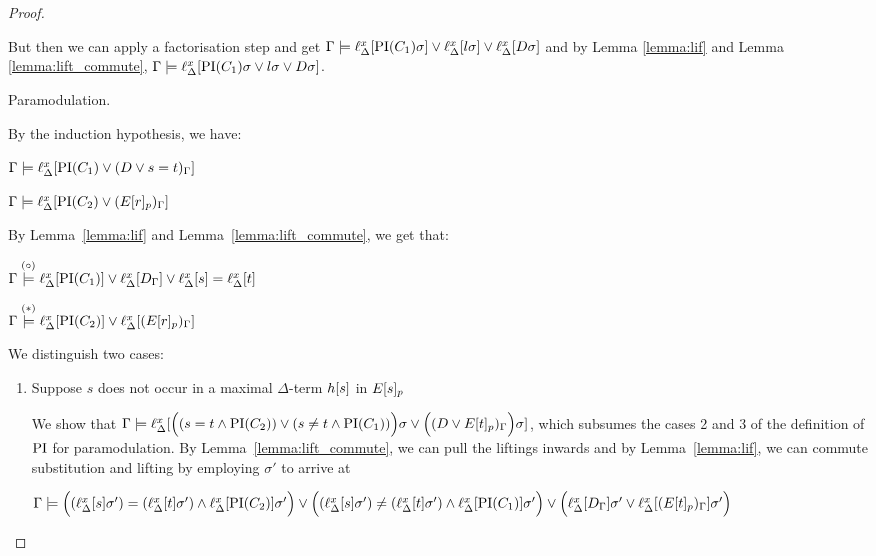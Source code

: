 \begin{proof}
\begin{description}
			But then we can apply a factorisation step and get
			$\Gamma \models \ell_{\Delta}^{x}[\operatorname{PI}(C_1)\sigma] \lor \ell_{\Delta}^{x}[l\sigma] \lor \ell_{\Delta}^{x}[D\sigma]$ and by Lemma \ref{lemma:lif} and Lemma \ref{lemma:lift_commute}, 
			$\Gamma \entails\nolinebreak \lifdelta{\PI(C_1)\sigma \lor l\sigma \lor D\sigma}$.



		\item{Paramodulation.}
			\begin{prooftree}
			\end{prooftree}
			By the induction hypothesis, we have:

			$\Gamma \models \ell_{\Delta}^{x}[\operatorname{PI}(C_1) \lor (D\lor s=t)_\Gamma]$

			$\Gamma \models \ell_{\Delta}^{x}[\operatorname{PI}(C_2) \lor (E{[r]_{p}})_\Gamma]$

			By Lemma~\ref{lemma:lif} and Lemma~\ref{lemma:lift_commute}, we get that:

			$\Gamma \stackrel{(\circ)}{\models} \ell_{\Delta}^{x}[\operatorname{PI}(C_1)] \lor \ell_{\Delta}^{x}[D_\Gamma] \lor \ell_{\Delta}^{x}[s] = \ell_{\Delta}^{x}[t]$

			$\Gamma \stackrel{(*)}{\models} \ell_{\Delta}^{x}[\operatorname{PI}(C_2)] \lor \ell_{\Delta}^{x}[(E{[r]_{p}})_\Gamma]$
\bigskip
		

	
			We distinguish two cases:\nopagebreak
			\begin{enumerate}
				\item Suppose $s$ does not occur in a maximal $\Delta$-term $h[s]$ in $E{[s]_{p}}$
\label{klehjy}

					We show that $\Gamma \models \ell_{\Delta}^{x}[ \Big((s=t \land \operatorname{PI}(C_2)) \lor (s\neq t \land \operatorname{PI}(C_1))\Big)\sigma \lor \Big((D \lor E{[t]_{p}})_\Gamma\Big)\sigma]$, which subsumes the cases 2 and 3 of the definition of $\operatorname{PI}$ for paramodulation.
					By Lemma~\ref{lemma:lift_commute}, we can pull the liftings inwards and by Lemma~\ref{lemma:lif}, we can commute substitution and lifting by employing $\sigma'$ to arrive at

				$\Gamma \models
				\Big((\ell_{\Delta}^{x}[s]\sigma')=(\ell_{\Delta}^{x}[t]\sigma') \land \ell_{\Delta}^{x}[\operatorname{PI}(C_2)]\sigma'\Big) \lor
				\Big((\ell_{\Delta}^{x}[s]\sigma')\neq(\ell_{\Delta}^{x}[t]\sigma') \land \ell_{\Delta}^{x}[\operatorname{PI}(C_1)]\sigma'\Big) \lor
				\Big(\ell_{\Delta}^{x}[D_\Gamma]\sigma' \lor \ell_{\Delta}^{x}[(E{[t]_{p}})_\Gamma]\sigma'\Big)$


\end{enumerate}
\end{description}
\end{proof}
